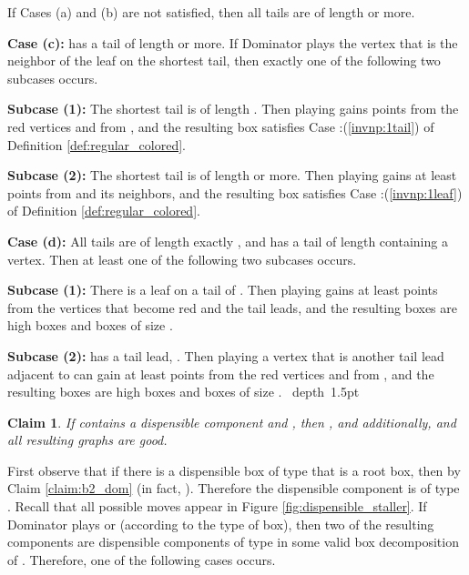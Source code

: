 \documentclass[11pt]{article}
\def\Proof{\par\noindent{\bf Proof:~}}
\def\blackslug{\hbox{\hskip 1pt \vrule width 4pt height 8pt
    depth 1.5pt \hskip 1pt}}
\def\QED{\quad\blackslug\lower 8.5pt\null\par}
\newtheorem{claim}[theorem]{Claim}
\theoremstyle{definition}
\begin{document}
\smallskip
\par\noindent
If Cases (a) and (b) are not satisfied, then all tails are of length  or more.

\smallskip
\par\noindent
{\bf Case (c):}
 has a tail of length  or more.
If Dominator plays the vertex  that is the neighbor of the leaf on the shortest tail, then exactly one of the following two subcases occurs.
\smallskip
\par\noindent
{\bf Subcase (1):}
	The shortest tail is of length . 
	Then playing  gains  points from the red vertices and from , and the resulting box satisfies Case :(\ref{invnp:1tail}) of Definition \ref{def:regular_colored}.
\smallskip
\par\noindent
{\bf Subcase (2):}
	The shortest tail is of length  or more.
	Then playing  gains at least  points from  and its neighbors, and the resulting box satisfies Case :(\ref{invnp:1leaf}) of Definition \ref{def:regular_colored}.

\bigskip
\par\noindent
{\bf Case (d):}
All tails are of length exactly , and  has a tail of length  containing a  vertex.
Then at least one of the following two subcases occurs.
\smallskip
\par\noindent
{\bf Subcase (1):}
	There is a  leaf on a tail of .
	Then playing  gains at least  points from the vertices that become red and the tail leads, and the resulting boxes are high boxes and boxes of size .
\smallskip
\par\noindent
{\bf Subcase (2):}
	 has a  tail lead, .
	Then playing a vertex  that is another tail lead adjacent to  can gain at least  points from the red vertices and from , 
	and the resulting boxes are high boxes and boxes of size .
\QED

\begin{claim}
\label{claim:t4_dom}
If  contains a dispensible component and , then , and additionally,  and all resulting graphs are good.
\end{claim}
\Proof
First observe that if there is a dispensible box of type  that is a root box, then  by Claim \ref{claim:b2_dom} (in fact, ).
Therefore the dispensible component is of type .
Recall that all possible moves appear in Figure \ref{fig:dispensible_staller}.
If Dominator plays  or  (according to the type of  box), 
then two of the resulting components are dispensible components of type  in some valid box decomposition  of .
Therefore, one of the following cases occurs.
\end{document}
